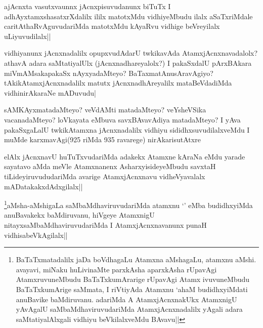 
\begin{artha}
ajAcnxta vasutxvaunnx jAcnxpisuvudanunx biTuTx I adhAyxtamxshasatxrXdalilx ililx matotxMdu vidhiyeMbudu ilalx aSaTxriMdale caritAthaRvAguvudariMda matotxMdu kAyaRvu vidhige beVreyilalx uLiyuvudilalx||
\end{artha}

\begin{artha}
vidhiyanunx jAcnxnadalilx opupxvudAdarU twkikavAda AtamxjAcnxnavadalolx? athavA adara saMtatiyalUlx (jAcnxnadhareyalolx?) I pakaSxdalU pArxBAkara miVmAMsakapakaSx nAyxyadaMteyo? BaTaxmatAnusAravAgiyo?tAkikAtamxjAcnxnadalilx matutx jAcnxnadhAreyalilx mataBeVdadiMda vidhinirAkaraNe mADuvudu|
\end{artha}

\begin{artha}
sAMKAyxmatadaMteyo? veVdAMti matadaMteyo? veYsheVSika vacanadaMteyo? loVkayata eMbuva savxBAvavAdiya matadaMteyo? I yAva pakaSxgaLalU twkikAtamxna jAcnxnadalilx vidhiyu sididhxsuvudilalxveMdu I muMde karxmavAgi(925 riMda 935 ravarege) nirAkarisutAtxre
\end{artha}


\begin{artha}
elAlx jAcnxnavU huTuTxvudariMda adakekx Atamxne kAraNa eMdu yarade sayatavo aMda meVle Atamxnanenx AsharxyisideyeMbudu savxtaH tiLideyiruvududariMda avarige AtamxjAcnxnavu vidheVyavalalx mADatakakxdAdxgilalx||
\end{artha}


\begin{artha}
\footnote{BaTaTxmatadalilx jaDa boVdhagaLu Atamxna aMshagaLu, atamxnu aMshi. avayavi, miNaku huLivinaMte parxkAsha aparxkAsha rUpavAgi AtamxruvuneMbudu BaTaTxkumArarige rUpavAgi Atamx ivuvuneMbudu BaTaTxkumArige saMmata, I riVtiyAda Atamxnu `ahaM budidhxyiMdati anuBavike baMdiruvanu. adariMda A AtamxjAcnxnakUkx AtamxnigU yAvAgalU saMbaMdhaviruvudariMda AtamxjAcnxnadalilx yAgali adara saMtatiyalAlxgali vidhiyu beVkilalxveMdu BAvavu||}aMsha-aMshigaLa saMbaMdhaviruvudariMda atamxnu `\stext' eMba budidhxyiMda anuBavakekx baMdiruvanu, hiVgeye AtamxnigU nitayxsaMbaMdhaviruvudariMda I AtamxjAcnxnavanunx punaH vidhisabeVkAgilalx||
\end{artha}

